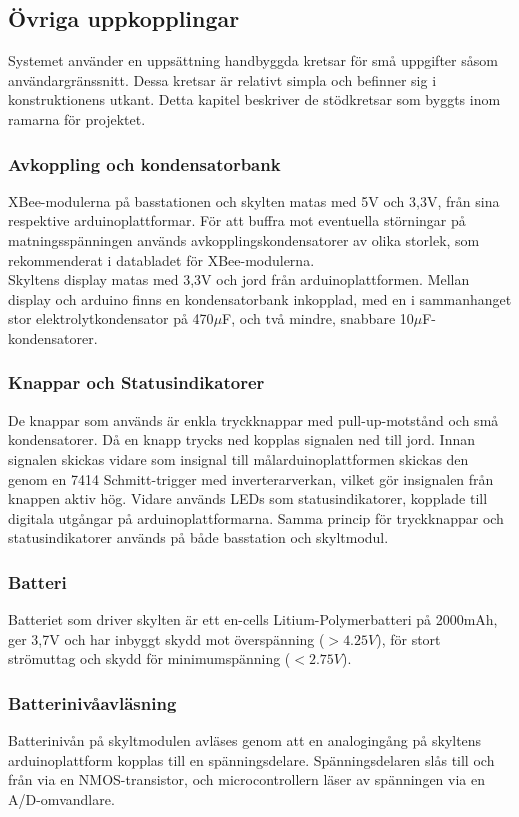 \documentclass[a4paper,11pt]{article}
\begin{document}
\subsection{Övriga uppkopplingar}
Systemet använder en uppsättning handbyggda kretsar för små uppgifter såsom användargränssnitt. Dessa kretsar är relativt simpla och befinner sig i konstruktionens utkant. Detta kapitel beskriver de stödkretsar som byggts inom ramarna för projektet.

\subsubsection{Avkoppling och kondensatorbank}
XBee-modulerna på basstationen och skylten matas med 5V och 3,3V, från sina respektive arduinoplattformar. För att buffra mot eventuella störningar på matningsspänningen används avkopplingskondensatorer av olika storlek, som rekommenderat i databladet för XBee-modulerna. \\

Skyltens display matas med 3,3V och jord från arduinoplattformen. Mellan display och arduino finns en kondensatorbank inkopplad, med en i sammanhanget stor elektrolytkondensator på 470$\mu$F, och två mindre, snabbare 10$\mu$F-kondensatorer. 

\subsubsection{Knappar och Statusindikatorer}
De knappar som används är enkla tryckknappar med pull-up-motstånd och små kondensatorer. Då en knapp trycks ned kopplas signalen ned till jord. Innan signalen skickas vidare som insignal till målarduinoplattformen skickas den genom en 7414 Schmitt-trigger med inverterarverkan, vilket gör insignalen från knappen aktiv hög. Vidare används LEDs som statusindikatorer, kopplade till digitala utgångar på arduinoplattformarna. Samma princip för tryckknappar och statusindikatorer används på både basstation och skyltmodul.

\subsubsection{Batteri}
Batteriet som driver skylten är ett en-cells Litium-Polymerbatteri på 2000mAh, ger 3,7V och har inbyggt skydd mot överspänning ($>4.25V$), för stort strömuttag och skydd för minimumspänning ($<2.75V$).

\subsubsection{Batterinivåavläsning}
Batterinivån på skyltmodulen avläses genom att en analogingång på skyltens arduinoplattform kopplas till en spänningsdelare. Spänningsdelaren slås till och från via en NMOS-transistor, och microcontrollern läser av spänningen via en A/D-omvandlare.
\end{document}

